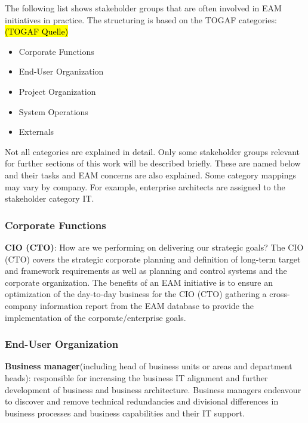 The following list shows stakeholder groups that are often involved in EAM initiatives in practice. The structuring is based on the TOGAF categories:\hl{(TOGAF Quelle)}
\begin{itemize}
    \item Corporate Functions
    \item End-User Organization
    \item Project Organization
    \item System Operations
    \item Externals
\end{itemize}

Not all categories are explained in detail. Only some stakeholder groups relevant for further sections of this work will be described briefly. These are named below and their tasks and EAM concerns are also explained. Some category mappings may vary by company. For example, enterprise architects are assigned to the stakeholder category IT.

\subsubsection{Corporate Functions}
\textbf{CIO (CTO)}: How are we performing on delivering our strategic goals? The CIO (CTO) covers the strategic corporate planning and definition of long-term target and framework requirements as well as planning and control systems and the corporate organization. The benefits of an EAM initiative is to ensure an optimization of the day-to-day business for the CIO (CTO) gathering a cross-company information report from the EAM database to provide the implementation of the corporate/enterprise goals.

\subsubsection{End-User Organization}
\textbf{Business manager}(including head of business units or areas and department heads): responsible for increasing the business IT alignment and further development of business and business architecture. Business managers endeavour to discover and remove technical redundancies and divisional differences in business processes and business capabilities and their IT support.

